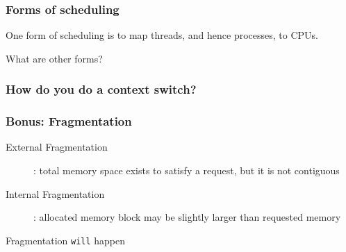 
\subsubsection*{Forms of scheduling}
One form of scheduling is to map threads, and hence processes, to CPUs.

What are other forms?

\subsubsection*{How do you do a context switch?}


\subsubsection*{Bonus: Fragmentation}
\begin{description}
\item[External Fragmentation]: total memory space exists to satisfy a request, but it is not contiguous
\item[Internal Fragmentation]: allocated memory block may be slightly larger than requested memory
\end{description}
Fragmentation \texttt{will} happen